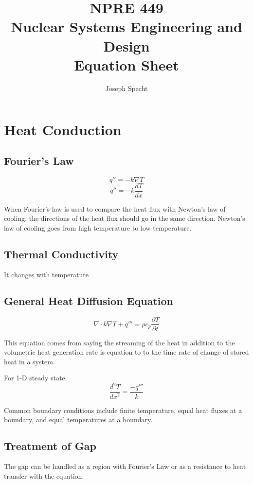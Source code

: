 \documentclass{article}
\title{NPRE 449 \\ Nuclear Systems Engineering and Design \\ Equation Sheet}
\author{Joseph Specht}
\begin{document}
\maketitle
\tableofcontents

\newpage
\section{Heat Conduction}

\subsection{Fourier's Law}
\begin{equation}
    q'' = - k \nabla T
\end{equation}
\begin{equation}
    q'' = -k \frac{dT}{dx}
\end{equation}

When Fourier's law is used to compare the heat flux with Newton's law of cooling, the directions of the heat flux should go in the same direction. Newton's law of cooling goes from high temperature to low temperature.

\subsection{Thermal Conductivity}
It changes with temperature

\subsection{General Heat Diffusion Equation}
\begin{equation}
    \nabla \cdot k \nabla T + q''' = \rho c_p \frac{\partial T}{\partial t}
\end{equation}

This equation comes from saying the streaming of the heat in addition to the volumetric heat generation rate is equation to to the time rate of change of stored heat in a system.

For 1-D steady state.
\begin{equation}
    \frac{d^2T}{dx^2} = \frac{-q'''}{k}
\end{equation}

Common boundary conditions include finite temperature, equal heat fluxes at a boundary, and equal temperatures at a boundary.

\subsection{Treatment of Gap}
The gap can be handled as a region with Fourier's Law or as a resistance to heat transfer with the equation:
\end{document}
